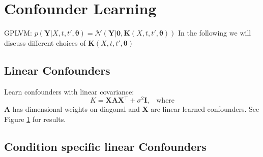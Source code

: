 \documentclass[a4paper,tablecaptionabove]{article}
\newcommand{\matr}[1]{\ensuremath{\mathbf{#1}}}
\newcommand{\T}{\ensuremath{^\top}}
\begin{document}
\section{Confounder Learning}
\label{sec:confounder-learning}

GPLVM: $p(\matr Y|X,t,t',\matr\theta) = \mathcal N(\matr Y|\matr 0,
\matr K(X,t,t',\matr\theta))$
In the following we will discuss different choices of $\matr K(X,t,t',\matr\theta)$

\subsection{Linear Confounders}
\label{sec:linear-confounders}

Learn confounders with linear covariance:
\begin{equation}
  \label{eq:4}
  K = \matr{XAX}\T + \sigma^2\matr I,\enspace\text{ where}
\end{equation}
$\matr A$ has dimensional weights on diagonal and $\matr X$ are linear
learned confounders. See Figure \ref{fig:linear-conf-matr} for results.

\begin{figure}[h]
  \centering
  \hspace{\fill}
  \hfill
  \caption{\subsectionname}
  \label{fig:linear-conf-matr}
\end{figure}

\subsection{Condition specific linear Confounders}
\label{sec:linear-confounders}
\end{document}
